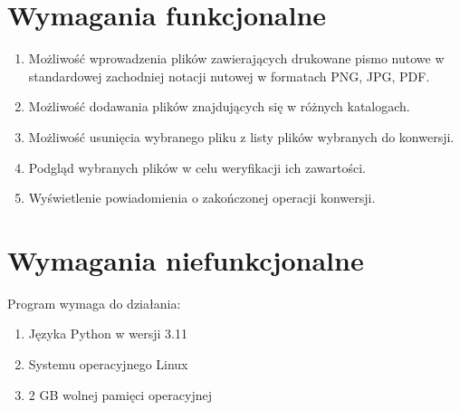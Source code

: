 \section{Wymagania funkcjonalne}
	\begin{enumerate}
		\item Możliwość wprowadzenia plików zawierających drukowane pismo nutowe w standardowej zachodniej notacji nutowej w formatach PNG, JPG, PDF.
		\item Możliwość dodawania plików znajdujących się w różnych katalogach.
		\item Możliwość usunięcia wybranego pliku z listy plików wybranych do konwersji.
		\item Podgląd wybranych plików w celu weryfikacji ich zawartości.
		\item Wyświetlenie powiadomienia o zakończonej operacji konwersji.
	\end{enumerate}
	
	
\section{Wymagania niefunkcjonalne}
Program wymaga do działania:
	\begin{enumerate}
		\item Języka Python w wersji 3.11
		\item Systemu operacyjnego Linux
		\item 2 GB wolnej pamięci operacyjnej
	\end{enumerate}